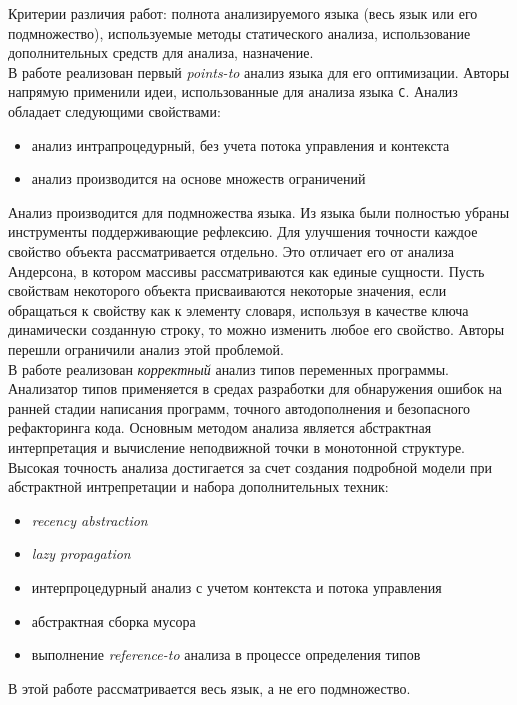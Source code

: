 Критерии различия работ: полнота анализируемого языка (весь язык или
его подмножество), используемые методы статического анализа,
использование дополнительных средств для анализа, назначение.  \\

В работе \cite{jang2009points} реализован первый \emph{points-to}
анализ языка для его оптимизации. Авторы напрямую применили идеи,
использованные для анализа языка \texttt{С}. Анализ обладает следующими
свойствами:
\begin{itemize}
  \item 
    анализ интрапроцедурный, без учета потока управления и контекста
  \item 
    анализ производится на основе множеств ограничений
    \cite{heintze1992set}
\end{itemize}
Анализ производится для подмножества языка\cite{thiemann2005towards}. Из языка были полностью
убраны инструменты поддерживающие рефлексию. 
Для улучшения точности каждое свойство объекта рассматривается
отдельно. Это отличает его от анализа Андерсона, в котором массивы
рассматриваются как единые сущности. Пусть свойствам некоторого объекта
присваиваются некоторые значения, если обращаться к свойству как к
элементу словаря, используя в качестве ключа динамически созданную
строку, то можно изменить любое его свойство. Авторы перешли
ограничили анализ этой проблемой. \\

В работе \cite{jensen2009type} реализован \emph{корректный} анализ
типов переменных программы.  Анализатор типов применяется в средах
разработки для обнаружения ошибок на ранней стадии написания программ,
точного автодополнения и безопасного рефакторинга кода. Основным
методом анализа является абстрактная интерпретация и вычисление
неподвижной точки в монотонной структуре\cite{Nielson1999}. Высокая
точность анализа достигается за счет создания подробной модели при
абстрактной интрепретации и набора дополнительных техник:
\begin{itemize}
  \item 
    \emph{recency abstraction} \cite{Balakrishnan2006}
  \item 
    \emph{lazy propagation} \cite{jenseninterprocedural}
  \item 
    интерпроцедурный анализ с учетом контекста и потока управления
  \item 
    абстрактная сборка мусора \cite{Might2006} 
  \item 
    выполнение \emph{reference-to} анализа в процессе определения
    типов
\end{itemize}
В этой работе рассматривается весь язык, а не его подмножество. 
\\

